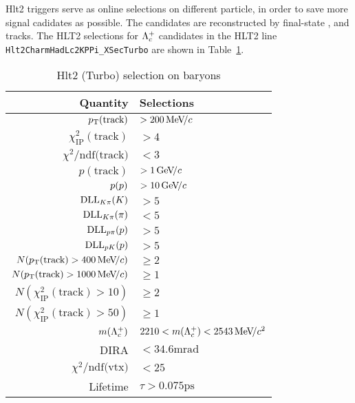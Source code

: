 Hlt2 triggers serve as online selections on different particle,
in order to save more signal cadidates as possible.
The \Lc candidates are reconstructed by final-state \proton, \Km and \pip tracks.
The HLT2 selections for ${{\Lambda}^+_{c}}$ candidates in the HLT2 line
{\tt{Hlt2CharmHadLc2KPPi\_XSecTurbo}} are shown in Table~\ref{tab:HLT2}.
\begin{table}[htbp]
    \caption{Hlt2 (Turbo) selection on \Lc baryons}
    \centering 
    \begin{tabular}{rl}
        \hline
        Quantity  & Selections \\
        \hline
        $p_{\mathrm{T}}(\text{track})$ & $>200\text{\,Me\kern -0.1em V\!/}c$            \\
        $\chi^2_{\text{IP}}(\text{track})$    &       $>4$                          \\
        $\chi^2/\text{ndf(track)}$     &       $<3$ \\
        $p(\text{track})$ &  $>1\text{\,Ge\kern -0.1em V\!/}c$                               \\
        $p({p})$ &  $>10\text{\,Ge\kern -0.1em V\!/}c$                               \\
        $\mathrm{DLL}_{{K}\pi}({K})$	&   $>5$                              \\
        $\mathrm{DLL}_{{K}\pi}({\pi})$	&   $<5$                              \\
        $\mathrm{DLL}_{{p}\pi}({p})$	&   $>5$                              \\
        $\mathrm{DLL}_{{p}{K}}({p})$	&   $>5$                              \\
        \hline
        $N(p_{\mathrm{T}}(\text{track})>400\text{\,Me\kern -0.1em V\!/}c)$ & $\geq 2$  \\
        $N(p_{\mathrm{T}}(\text{track})>1000\text{\,Me\kern -0.1em V\!/}c)$ & $\geq 1$  \\
        $N(\chi^2_{\text{IP}}(\text{track})>10)$ & $\geq 2$  \\
        $N(\chi^2_{\text{IP}}(\text{track})>50)$ & $\geq 1$  \\
        \hline
        $m({{\Lambda}^+_{c}})$  & $2210 < m({{\Lambda}^+_{c}}) < 2543 \text{\,Me\kern -0.1em V\!/}c^2$ \\
        DIRA & $<34.6 \mathrm{mrad}$   \\
        $\chi^2/\text{ndf(vtx)}$	   &    $<25$                            \\
        Lifetime	   &    $\tau>0.075\mathrm{ps}$                           \\
        \hline
    \end{tabular}\label{tab:HLT2} 
\end{table}

